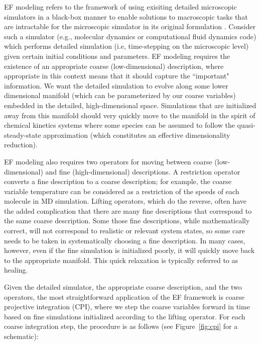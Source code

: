 \documentclass[12pt]{article}
\begin{document}
EF modeling refers to the framework of using exisiting detailed microscopic simulators in a black-box manner to enable solutions to macroscopic tasks that are intractable for the microscopic simulator in its original formulation \cite{Siettos2003, Kevrekidis2003, Kevrekidis2004}. Consider such a simulator (e.g., molecular dynamics or computational fluid dynamics code) which performs detailed simulation (i.e, time-stepping on the microscopic level) given certain initial conditions and parameters. EF modeling requires the existence of an appropriate coarse (low-dimensional) description, where appropriate in this context means that it should capture the ``important" information. We want the detailed simulation to evolve along some lower dimensional manifold (which can be parameterized by our coarse variables) embedded in the detailed, high-dimensional space. Simulations that are initialized away from this manifold should very quickly move to the manifold in the spirit of chemical kinetics systems where some species can be assumed to follow the quasi-steady-state approximation (which constitutes an effective dimensionality reduction).\vspace{1mm}

EF modeling also requires two operators for moving between coarse (low-dimensional) and fine (high-dimensional) descriptions. A restriction operator converts a fine description to a coarse description; for example, the coarse variable temperature can be considered as a restriction of the speeds of each molecule in MD simulation. Lifting operators, which do the reverse, often have the added complication that there are many fine descriptions that correspond to the same coarse description. Some those fine descriptions, while mathematically correct, will not correspond to realistic or relevant system states, so some care needs to be taken in systematically choosing a fine description. In many cases, however, even if the fine simulation is initialized poorly, it will quickly move back to the appropriate manifold. This quick relaxation is typically referred to as healing.\vspace{1mm}

Given the detailed simulator, the appropriate coarse description, and the two operators, the most straightforward application of the EF framework is coarse projective integration (CPI), where we step the coarse variables forward in time based on fine simulations initialized according to the lifting operator. For each coarse integration step, the procedure is as follows (see Figure~\ref{fig:cpi} for a schematic):  \vspace{1mm}
\end{document}
